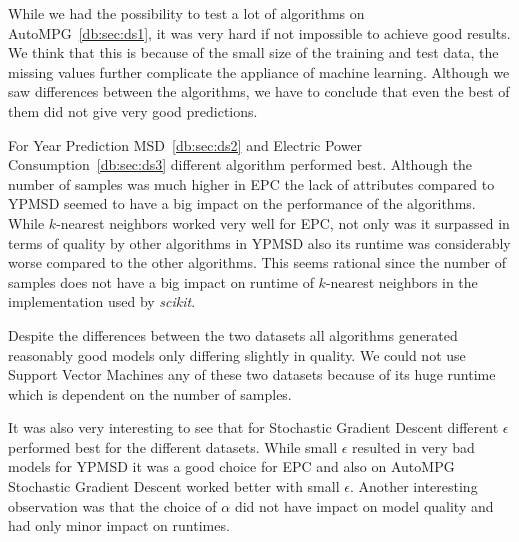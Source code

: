 While we had the possibility to test a lot of algorithms on AutoMPG~\ref{db:sec:ds1}, it was very hard if not impossible to achieve good results. We think that this is because of the small size of the training and test data, the missing values further complicate the appliance of machine learning. Although we saw differences between the algorithms, we have to conclude that even the best of them did not give very good predictions.\par
For Year Prediction MSD~\ref{db:sec:ds2} and Electric Power Consumption~\ref{db:sec:ds3} different algorithm performed best. Although the number of samples was much higher in EPC the lack of attributes compared to YPMSD seemed to have a big impact on the performance of the algorithms. While $k$-nearest neighbors worked very well for EPC, not only was it surpassed in terms of quality by other algorithms in YPMSD also its runtime was considerably worse compared to the other algorithms. This seems rational since the number of samples does not have a big impact on runtime of $k$-nearest neighbors in the implementation used by \textit{scikit}.\par
Despite the differences between the two datasets all algorithms generated reasonably good models only differing slightly in quality. We could not use Support Vector Machines any of these two datasets because of its huge runtime which is dependent on the number of samples.\par

It was also very interesting to see that for Stochastic Gradient Descent different $\epsilon$ performed best for the different datasets. While small $\epsilon$ resulted in very bad models for YPMSD it was a good choice for EPC and also on AutoMPG Stochastic Gradient Descent worked better with small $\epsilon$. Another interesting observation was that the choice of $\alpha$ did not have impact on model quality and had only minor impact on runtimes.
